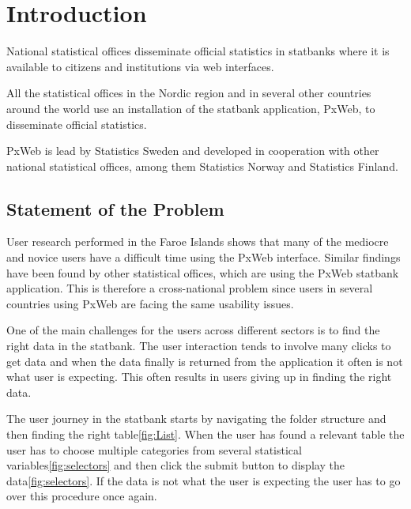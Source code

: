 
\chapter{Introduction} %

\label{ch:introduction} %


National statistical offices disseminate official statistics in statbanks where it is available to citizens and institutions via web interfaces.
 
All the statistical offices in the Nordic region and in several other countries around the world use an installation of the statbank application, PxWeb, to disseminate official statistics.
 
PxWeb is lead by Statistics Sweden and developed in cooperation with other national statistical offices, among them Statistics Norway and Statistics Finland.

\section{Statement of the Problem}
User research performed in the Faroe Islands shows that many of the mediocre and novice users have a difficult time using the PxWeb interface. Similar findings have been found by other statistical offices, which are using the PxWeb statbank application. This is therefore a cross-national problem since users in several countries using PxWeb are facing the same usability issues.
 
One of the main challenges for the users across different sectors is to find the right data in the statbank. The user interaction tends to involve many clicks to get data and when the data finally is returned from the application it often is not what user is expecting. This often results in users giving up in finding the right data.
 
The user journey in the statbank starts by navigating the folder structure and then finding the right table\ref{fig:List}. When the user has found a relevant table the user has to choose multiple categories from several statistical variables\ref{fig:selectors} and then click the submit button to display the data\ref{fig:selectors}. If the data is not what the user is expecting the user has to go over this procedure once again.




